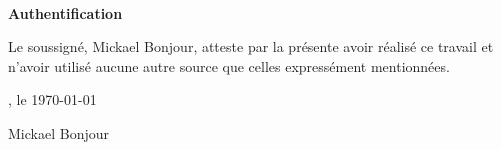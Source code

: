 
\begin{center}
    \textsc{\Large }\\[3cm]
    {\huge \bfseries Authentification}

    \vspace{1cm}
\end{center}

\noindent Le soussigné, {\color{gray} Mickael Bonjour}, atteste par la présente avoir réalisé  ce travail et n’avoir utilisé aucune autre source que celles expressément mentionnées.

\vspace{2cm}

, le \today

\vspace{3cm}

\begin{flushright}
    \begin{minipage}{7cm}
        {\color{gray} Mickael Bonjour}
    \end{minipage}\hfill
\end{flushright}